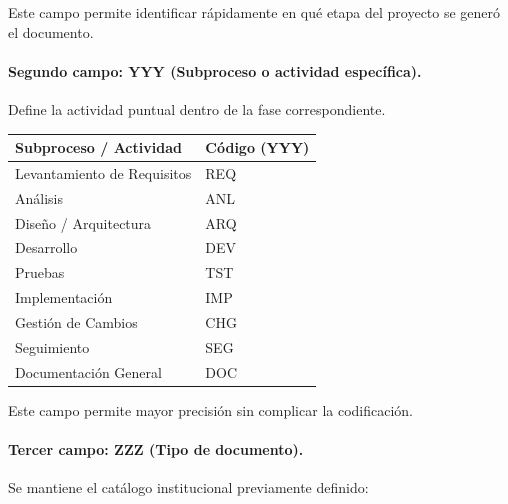\documentclass{encabezado}
\begin{document}
Este campo permite identificar rápidamente en qué etapa del proyecto se generó el documento.

\paragraph{Segundo campo: YYY (Subproceso o actividad específica).}

Define la actividad puntual dentro de la fase correspondiente.

\begin{center}
    \footnotesize
    \renewcommand{\arraystretch}{1.3}
    \begin{tabular}{p{7cm} p{2cm}}
        \hline
        \textbf{Subproceso / Actividad} & \textbf{Código (YYY)} \\
        \hline
        Levantamiento de Requisitos     & REQ                   \\
        Análisis                        & ANL                   \\
        Diseño / Arquitectura           & ARQ                   \\
        Desarrollo                      & DEV                   \\
        Pruebas                         & TST                   \\
        Implementación                  & IMP                   \\
        Gestión de Cambios              & CHG                   \\
        Seguimiento                     & SEG                   \\
        Documentación General           & DOC                   \\
        \hline
    \end{tabular}
\end{center}

Este campo permite mayor precisión sin complicar la codificación.

\paragraph{Tercer campo: ZZZ (Tipo de documento).}

Se mantiene el catálogo institucional previamente definido:
\end{document}
